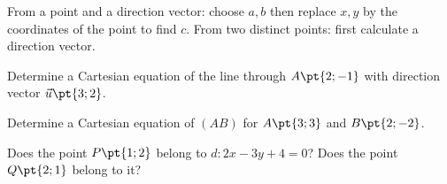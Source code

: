 \begin{method}
From a point and a direction vector: choose $a,b$ then replace $x,y$ by the coordinates of the point to find $c$. From two distinct points: first calculate a direction vector.
\end{method}
\begin{example}Determine a Cartesian equation of the line through $A\pt{2;-1}$ with direction vector $\vec u\pt{3;2}$.\end{example}
\begin{example}Determine a Cartesian equation of $(AB)$ for $A\pt{3;3}$ and $B\pt{2;-2}$.\end{example}
\begin{example}Does the point $P\pt{1;2}$ belong to $d:2x-3y+4=0$? Does the point $Q\pt{2;1}$ belong to it?\end{example}

